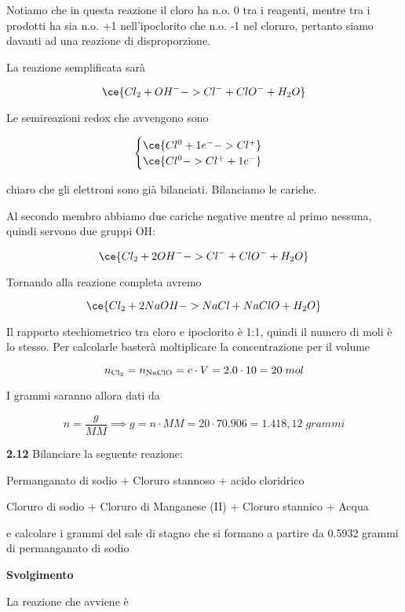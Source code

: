 Notiamo che in questa reazione il cloro ha n.o. 0 tra i reagenti, mentre tra i prodotti ha sia n.o. +1 nell'ipoclorito che n.o. -1 nel cloruro, pertanto siamo davanti ad una reazione di disproporzione.

La reazione semplificata sarà

$$\ce{Cl_2 + OH^- -> Cl^- + ClO^- + H_2O}$$

Le semireazioni redox che avvengono sono

$$\begin{cases}
    \ce{Cl^{0} + 1e^- -> Cl^+}\\
    \ce{Cl^{0} -> Cl^+ + 1e^-}
\end{cases}$$

\E chiaro che gli elettroni sono già bilanciati. Bilanciamo le cariche.

Al secondo membro abbiamo due cariche negative mentre al primo nessuna, quindi servono due gruppi OH:

$$\ce{Cl_2 + 2OH^- -> Cl^- + ClO^- + H_2O}$$

Tornando alla reazione completa avremo

$$\ce{Cl_2 + 2NaOH -> NaCl + NaClO + H_2O}$$

Il rapporto stechiometrico tra cloro e ipoclorito è 1:1, quindi il numero di moli è lo stesso. Per calcolarle basterà moltiplicare la concentrazione per il volume

$$n_{\rm Cl_2}=n_{\rm NaClO}=c \cdot V=2.0 \cdot 10=20\;mol$$

I grammi saranno allora dati da

$$n=\frac{g}{MM} \implies g=n \cdot MM=20 \cdot 70.906=1.418,12\;grammi$$

\vspace{0.2cm}\textbf{2.12} Bilanciare la seguente reazione:

\begin{center}
    Permanganato di sodio + Cloruro stannoso + acido cloridrico \ce{->}

    \ce{->} Cloruro di sodio + Cloruro di Manganese (II) + Cloruro stannico + Acqua
\end{center}

e calcolare i grammi del sale di stagno che si formano a partire da 0.5932 grammi di permanganato di sodio

\vspace{0.2cm}\large\textbf{Svolgimento}\normalsize

\vspace{0.2cm}La reazione che avviene è

